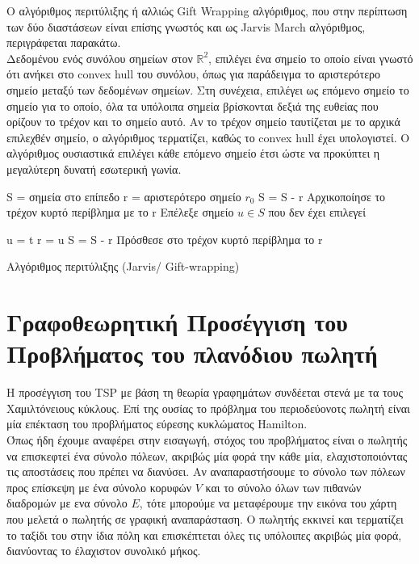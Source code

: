 \documentclass[oneside,12pt]{book}
\newcommand{\R}{\mathbb{R}}
\theoremstyle{definition}
\begin{document}
Ο αλγόριθμος περιτύλιξης ή αλλιώς Gift Wrapping αλγόριθμος, που στην περίπτωση των δύο διαστάσεων είναι
επίσης γνωστός και ως Jarvis March αλγόριθμος, περιγράφεται παρακάτω. \\

Δεδομένου ενός συνόλου σημείων στον \( \R^2 \),	επιλέγει ένα σημείο το οποίο είναι γνωστό ότι ανήκει στο convex hull του συνόλου, όπως για παράδειγμα το αριστερότερο σημείο μεταξύ των δεδομένων σημείων. Στη συνέχεια, επιλέγει ως επόμενο σημείο το σημείο για το οποίο, όλα τα υπόλοιπα σημεία βρίσκονται δεξιά της ευθείας που ορίζουν το τρέχον και το σημείο αυτό. Αν το τρέχον σημείο ταυτίζεται με το αρχικά επιλεχθέν σημείο, ο αλγόριθμος τερματίζει, καθώς το convex hull έχει υπολογιστεί. Ο αλγόριθμος ουσιαστικά επιλέγει κάθε επόμενο σημείο έτσι ώστε να προκύπτει η μεγαλύτερη δυνατή εσωτερική γωνία. \\

\begin{algorithm}[H]
	\SetAlgoLined

	S = σημεία στο επίπεδο \;
	r = αριστερότερο σημείο \(r_0\) \;
	S = S - r \;
	Αρχικοποίησε το τρέχον κυρτό περίβλημα με το r \;
	Επέλεξε σημείο \(u \in S\) που δεν έχει επιλεγεί \;

	{
		{
			{
				u = t
			}
		}
		r = u \;
		S = S - {r} \;
		Πρόσθεσε στο τρέχον κυρτό περίβλημα το r \;
	}

	\caption{Αλγόριθμος περιτύλιξης (Jarvis/ Gift-wrapping)}
\end{algorithm}

\chapter{Γραφοθεωρητική Προσέγγιση του Προβλήματος του πλανόδιου πωλητή}

Η προσέγγιση του TSP με βάση τη θεωρία γραφημάτων συνδέεται στενά με τα τους Χαμιλτόνειους κύκλους. Επί της ουσίας το πρόβλημα του περιοδεύονοτς πωλητή είναι μία επέκταση του προβλήματος εύρεσης κυκλώματος Hamilton. \\

Όπως ήδη έχουμε αναφέρει στην εισαγωγή, στόχος του προβλήματος είναι ο πωλητής να επισκεφτεί ένα σύνολο πόλεων, ακριβώς μία φορά την κάθε μία, ελαχιστοποιόντας τις αποστάσεις που πρέπει να διανύσει. Αν αναπαραστήσουμε το σύνολο των πόλεων προς επίσκεψη με ένα σύνολο κορυφών \(V\) και το σύνολο όλων των πιθανών διαδρομών με ενα σύνολο \(E\), τότε μπορούμε να μεταφέρουμε την εικόνα του χάρτη που μελετά ο πωλητής σε γραφική αναπαράσταση. Ο πωλητής εκκινεί και τερματίζει το ταξίδι του στην ίδια πόλη και επισκέπτεται όλες τις υπόλοιπες ακριβώς μία φορά, διανύοντας το έλαχιστον συνολικό μήκος. \\
\end{document}
